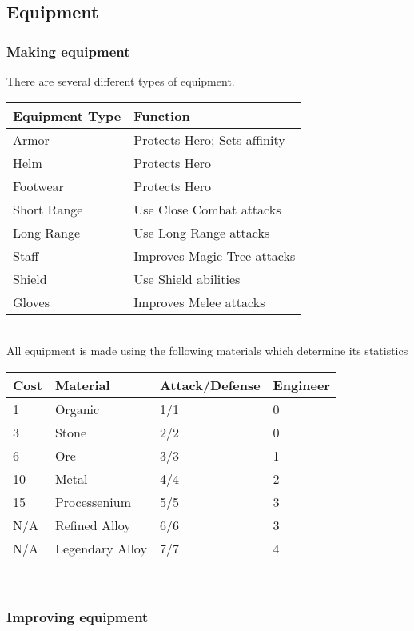 \subsection{Equipment}
\subsubsection{Making equipment}
There are several different types of equipment. \\
\begin{tabularx}{\textwidth}{X X}
\hline
Equipment Type & Function \\
\hline 
Armor & Protects Hero;  Sets affinity\\
Helm & Protects Hero\\
Footwear & Protects Hero\\ 
Short Range & Use Close Combat attacks\\
Long Range & Use Long Range attacks \\
Staff & Improves Magic Tree attacks\\
Shield & Use Shield abilities\\
Gloves & Improves Melee attacks\\
\hline
\end{tabularx}\\

All equipment is made using the following materials which determine its statistics
\begin{center}
\begin{tabularx}{\textwidth}{X X X X}
\hline
Cost& Material& Attack/Defense & Engineer\\
\hline
1 & Organic & 1/1 & 0\\
3& Stone & 2/2 & 0\\
6& Ore& 3/3& 1\\
10& Metal& 4/4& 2\\
15& Processenium& 5/5& 3\\
N/A& Refined Alloy& 6/6& 3\\
N/A& Legendary Alloy& 7/7& 4\\
\hline
\end{tabularx}\\
\end{center}


\subsubsection{Improving equipment}

